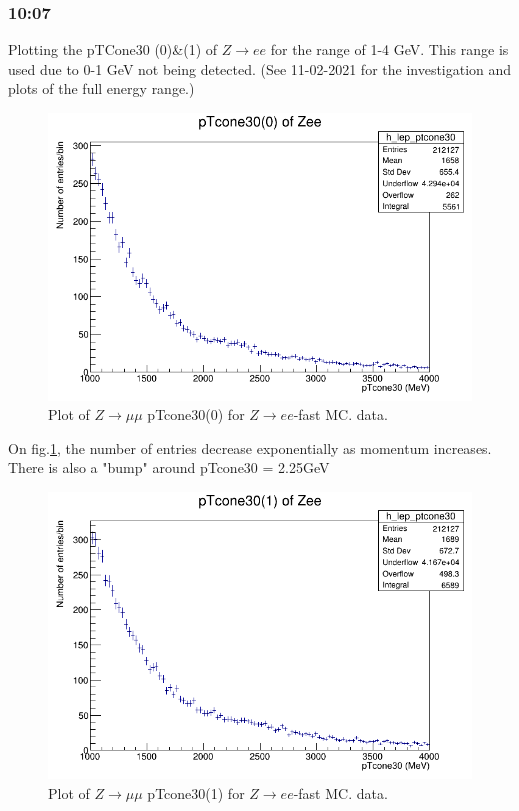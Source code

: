 \subsubsection*{10:07}
Plotting the pTCone30 (0)\&(1) of $Z\rightarrow ee$ for the range of 1-4 GeV. This range is used due to 0-1 GeV not being detected. (See 11-02-2021 for the investigation and plots of the full energy range.)

\begin{figure}[h!]
    \centering
    \includegraphics[width=0.85\linewidth]{plots/16-02-2021/Zee_fast_pTcone30(0)_1-4GeV_16-02-21_10-07.png}
    \caption{Plot of  $Z \rightarrow \mu\mu$ pTcone30(0) for $Z\rightarrow ee$-fast MC.  data.}\label{fig:/Zee_fast_pTcone30(0)_1-4GeV_16-02-21_10-07}
\end{figure}

On fig.\ref{fig:/Zee_fast_pTcone30(0)_1-4GeV_16-02-21_10-07}, the number of entries decrease exponentially as momentum increases.  There is also a "bump" around pTcone30 = 2.25GeV

\begin{figure}[h!]
    \centering
    \includegraphics[width=0.85\linewidth]{plots/16-02-2021/Zee_fast_pTcone30(1)_1-4GeV_16-02-21_10-12.png}
    \caption{Plot of  $Z \rightarrow \mu\mu$ pTcone30(1) for $Z\rightarrow ee$-fast MC.  data.}\label{fig:Zee_fast_pTcone30(1)_1-4GeV_16-02-21_10-12}
\end{figure}

